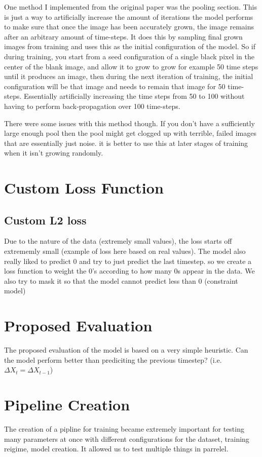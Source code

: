 One method I implemented from the original paper was the pooling section. This is just a way to artificially increase the amount of iterations the model performs to make sure that once the image has been accurately grown, the image remains after an arbitrary amount of time-steps. It does this by sampling final grown images from training and uses this as the initial configuration of the model. So if during training, you start from a seed configuration of a single black pixel in the center of the blank image, and allow it to grow to grow for example 50 time steps until it produces an image, then during the next iteration of training, the initial configuration will be that image and needs to remain that image for 50 time-steps. Essentially artificially increasing the time steps from 50 to 100 without having to perform back-propagation over 100 time-steps.

There were some issues with this method though. If you don't have a sufficiently large enough pool then the pool might get clogged up with terrible, failed images that are essentially just noise. it is better to use this at later stages of training when it isn't growing randomly.

\section{Custom Loss Function}
\subsection{Custom L2 loss}
Due to the nature of the data (extremely small values), the loss starts off extrememly small (example of loss here based on real values). The model also really liked to predict 0 and try to just predict the last timestep. so we create a loss function to weight the 0's according to how many 0s appear in the data. We also try to mask it so that the model cannot predict less than 0 (constraint model)
\section{Proposed Evaluation}
The proposed evaluation of the model is based on a very simple heuristic. Can the model perform better than prediciting the previous timestep? (i.e. $\Delta{X_{t}} = \Delta{X_{t-1}}$)
\section{Pipeline Creation}
The creation of a pipline for training became extremely important for testing many parameters at once with different configurations for the dataset, training reigime, model creation. It allowed us to test multiple things in parrelel.